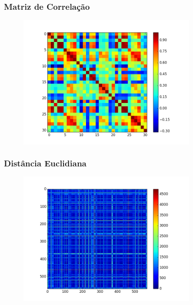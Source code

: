 \documentclass{beamer}
\begin{document}
\begin{frame}
\frametitle{Matriz de Correlação}
\begin{figure}[H]
    \centering
    \includegraphics[width=0.8\textwidth]{../corrcoef.png}
    \label{fig:corrcoef}
\end{figure}
\end{frame}


\begin{frame}
\frametitle{Distância Euclidiana}
\begin{figure}[H]
    \centering
    \includegraphics[width=0.8\textwidth]{../dist.png}
    \label{fig:corrcoef}
\end{figure}
\end{frame}
\end{document}
